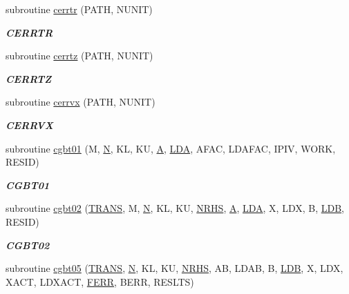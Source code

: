 \begin{DoxyCompactItemize}
subroutine \hyperlink{group__complex__lin_gac8ad9dd0bd8d77d89b89be4329e5decf}{cerrtr} (P\+A\+T\+H, N\+U\+N\+I\+T)
\begin{DoxyCompactList}\small\item\em {\bfseries C\+E\+R\+R\+T\+R} \end{DoxyCompactList}\item 
subroutine \hyperlink{group__complex__lin_gaf9b46c73bcf2f9487b863d5ce3e095b9}{cerrtz} (P\+A\+T\+H, N\+U\+N\+I\+T)
\begin{DoxyCompactList}\small\item\em {\bfseries C\+E\+R\+R\+T\+Z} \end{DoxyCompactList}\item 
subroutine \hyperlink{group__complex__lin_gae830a7c335c90c7544888caf415d058e}{cerrvx} (P\+A\+T\+H, N\+U\+N\+I\+T)
\begin{DoxyCompactList}\small\item\em {\bfseries C\+E\+R\+R\+V\+X} \end{DoxyCompactList}\item 
subroutine \hyperlink{group__complex__lin_gac0acaf8e78749d01c091e90b7736534a}{cgbt01} (M, \hyperlink{polmisc_8c_a0240ac851181b84ac374872dc5434ee4}{N}, K\+L, K\+U, \hyperlink{classA}{A}, \hyperlink{example__user_8c_ae946da542ce0db94dced19b2ecefd1aa}{L\+D\+A}, A\+F\+A\+C, L\+D\+A\+F\+A\+C, I\+P\+I\+V, W\+O\+R\+K, R\+E\+S\+I\+D)
\begin{DoxyCompactList}\small\item\em {\bfseries C\+G\+B\+T01} \end{DoxyCompactList}\item 
subroutine \hyperlink{group__complex__lin_gad855f9ac0e71ec5fcbdf81975cf8c71b}{cgbt02} (\hyperlink{superlu__enum__consts_8h_a0c4e17b2d5cea33f9991ccc6a6678d62a1f61e3015bfe0f0c2c3fda4c5a0cdf58}{T\+R\+A\+N\+S}, M, \hyperlink{polmisc_8c_a0240ac851181b84ac374872dc5434ee4}{N}, K\+L, K\+U, \hyperlink{example__user_8c_aa0138da002ce2a90360df2f521eb3198}{N\+R\+H\+S}, \hyperlink{classA}{A}, \hyperlink{example__user_8c_ae946da542ce0db94dced19b2ecefd1aa}{L\+D\+A}, X, L\+D\+X, B, \hyperlink{example__user_8c_a50e90a7104df172b5a89a06c47fcca04}{L\+D\+B}, R\+E\+S\+I\+D)
\begin{DoxyCompactList}\small\item\em {\bfseries C\+G\+B\+T02} \end{DoxyCompactList}\item 
subroutine \hyperlink{group__complex__lin_ga41aed724ee1043fa9dd7b7a027557b9f}{cgbt05} (\hyperlink{superlu__enum__consts_8h_a0c4e17b2d5cea33f9991ccc6a6678d62a1f61e3015bfe0f0c2c3fda4c5a0cdf58}{T\+R\+A\+N\+S}, \hyperlink{polmisc_8c_a0240ac851181b84ac374872dc5434ee4}{N}, K\+L, K\+U, \hyperlink{example__user_8c_aa0138da002ce2a90360df2f521eb3198}{N\+R\+H\+S}, A\+B, L\+D\+A\+B, B, \hyperlink{example__user_8c_a50e90a7104df172b5a89a06c47fcca04}{L\+D\+B}, X, L\+D\+X, X\+A\+C\+T, L\+D\+X\+A\+C\+T, \hyperlink{superlu__enum__consts_8h_af00a42ecad444bbda75cde1b64bd7e72a78fd14d7abebae04095cfbe02928f153}{F\+E\+R\+R}, B\+E\+R\+R, R\+E\+S\+L\+T\+S)

\end{DoxyCompactItemize}
